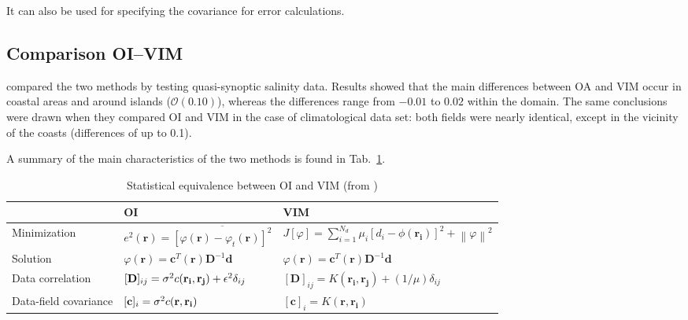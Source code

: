 It can also be used for specifying the covariance for error calculations.%





\subsection{Comparison OI--VIM}

\cite{RIXEN00} compared the two methods by testing quasi-synoptic salinity data. Results showed that the main differences between OA and VIM occur in coastal areas and around islands ($\mathcal{O}(0.10)$), whereas the differences range from $-0.01$ to $0.02$ within the domain. The same conclusions were drawn when they compared OI and VIM in the case of climatological data set: both fields were nearly identical, except in the vicinity of the coasts (differences of up to 0.1).

A summary of the main characteristics of the two methods is found in Tab.~\ref{tabOAVIM}.


\begin{table}[htpb]
\caption{Statistical equivalence between OI and VIM (from \cite{RIXEN00})\label{tabOAVIM}}
\begin{tabular*}{0.99\textwidth}{@{\extracolsep{\fill}}lll}
\toprule
											&		OI	& VIM \\
\midrule
Minimization \rule{0pt}{3ex}	& $e^{2}(\mathbf{r})= \overline{ [\varphi(\mathbf{r})-\varphi_{t}(\mathbf{r})]^{2}}$ 	& $J[\varphi]=\sum_{i=1}^{N_d}\mu_{i}[d_{i}-\phi(\mathbf{r_{i}})]^{2}+\left\|\varphi\right\|^{2}$							\\
Solution						& $\varphi(\mathbf{r})= \mathbf{c}^{T}(\mathbf{r})\mathbf{D}^{-1}\mathbf{d}$			& 
$\varphi(\mathbf{r})= \mathbf{c}^{T}(\mathbf{r})\mathbf{D}^{-1}\mathbf{d}$												\\
Data correlation				& $[\mathbf{D}]_{ij}=\sigma^{2} c(\mathbf{r_{i}},\mathbf{r_{j}})+\epsilon^{2}\delta_{ij}$& $[\mathbf{D}]_{ij}=K(\mathbf{r_i},\mathbf{r_j})+(1/\mu)\delta_{ij}$														\\
Data-field covariance 			& $[\mathbf{c}]_{i}=\sigma^{2} c(\mathbf{r},\mathbf{r_{i}})$							& $[\mathbf{c}]_{i}=K(\mathbf{r},\mathbf{r_{i}})$																			\\
\bottomrule
\end{tabular*}
\end{table}

